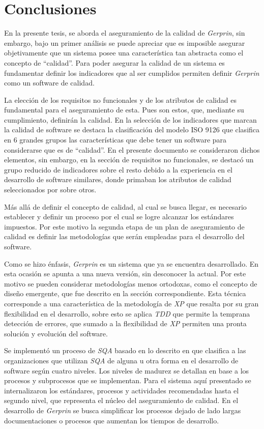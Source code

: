 
\chapter{Conclusiones }

En la presente tesis, se aborda el aseguramiento de la calidad de \emph{Gerprin}, sin embargo, bajo un primer análisis se puede apreciar que es imposible asegurar objetivamente que un sistema posee una característica tan abstracta como el concepto de “calidad”. Para poder asegurar la calidad de un sistema es fundamentar definir los indicadores que al ser cumplidos permiten definir \emph{Gerprin} como un software de calidad.

La elección de los requisitos no funcionales y de los atributos de calidad es fundamental para el aseguramiento de esta. Pues son estos, que, mediante su cumplimiento, definirán la calidad. En la selección de los indicadores que marcan la calidad de software se destaca la clasificación del modelo ISO 9126 que clasifica en 6 grandes grupos las características que debe tener un software para considerarse que es de “calidad”. En el presente documento se consideraron dichos elementos, sin embargo, en la sección de requisitos no funcionales, se destacó un grupo reducido de indicadores sobre el resto debido a la experiencia en el desarrollo de software similares, donde primaban los atributos de calidad seleccionados por sobre otros.

Más allá de definir el concepto de calidad, al cual se busca llegar, es necesario establecer y definir un proceso por el cual se logre alcanzar los estándares impuestos. Por este motivo la segunda etapa de un plan de aseguramiento de calidad es definir las metodologías que serán empleadas para el desarrollo del software. 

Como se hizo énfasis, \emph{Gerprin} es un sistema que ya se encuentra desarrollado. En esta ocasión se apunta a una nueva versión, sin desconocer la actual. Por este motivo se pueden considerar metodologías menos ortodoxas, como el concepto de diseño emergente, que fue descrito en la sección correspondiente. Esta técnica corresponde a una característica de la metodología de \emph{XP} que resalta por su gran flexibilidad en el desarrollo, sobre esto se aplica \emph{TDD} que permite la temprana detección de errores, que sumado a la flexibilidad de \emph{XP} permiten una pronta solución y evolución del software.

Se implementó un proceso de \emph{SQA} basado en lo descrito en \citep{web00} que clasifica a las organizaciones que utilizan \emph{SQA} de alguna u otra forma en el desarrollo de software según cuatro niveles. Los niveles de madurez se detallan en base a los procesos y subprocesos que se implementan. Para el sistema aquí presentado se internalizaron los estándares, procesos y actividades recomendadas hasta el segundo nivel, que representa el núcleo del aseguramiento de calidad. En el desarrollo de \emph{Gerprin} se busca simplificar los procesos dejado de lado largas documentaciones o procesos que aumentan los tiempos de desarrollo. 

